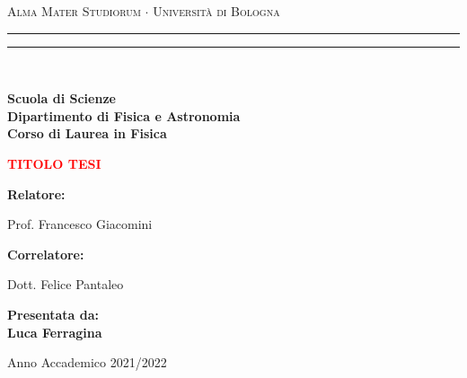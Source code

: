 \documentclass[12pt,a4paper]{report}
\begin{document}
\begin{titlepage}
\begin{center}
{{\Large{\textsc{Alma Mater Studiorum $\cdot$ Universit\`a di Bologna}}}} 
\rule[0.1cm]{15.8cm}{0.1mm}
\rule[0.5cm]{15.8cm}{0.6mm}
\\\vspace{3mm}

{\small{\bf Scuola di Scienze \\ 
Dipartimento di Fisica e Astronomia\\
Corso di Laurea in Fisica}}

\end{center}

\vspace{23mm}

\begin{center}\textcolor{red}{
%
%
{\LARGE{\bf TITOLO TESI}}\\
}\end{center}

\vspace{50mm} \par \noindent

\begin{minipage}[t]{0.47\textwidth}

\large{\bf Relatore: \vspace{2mm}

{Prof. Francesco Giacomini}}

\vspace{5mm}

\large{\bf Correlatore: \vspace{2mm}

{Dott. Felice Pantaleo}}

\end{minipage}
%
\hfill
%
\begin{minipage}[t]{0.47\textwidth}\raggedleft
{\large{\bf Presentata da:
\vspace{2mm}\\
Luca Ferragina}}
\end{minipage}

\vspace{40mm}

\begin{center}
%
%
Anno Accademico 2021/2022
\end{center}

\end{titlepage}

\tableofcontents
\end{document}

